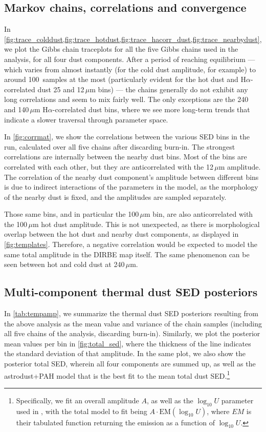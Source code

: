 \documentclass{aa}
\begin{document}
\subsection{Markov chains, correlations and convergence}
In
\cref{fig:trace_colddust,fig:trace_hotdust,fig:trace_hacorr_dust,fig:trace_nearbydust},
we plot the Gibbs chain traceplots for all the five Gibbs chains used
in the analysis, for all four dust components. After a period of
reaching equilibrium --- which varies from almost instantly (for the
cold dust amplitude, for example) to around 100~samples at the most
(particularly evident for the hot dust and H$\alpha$-correlated dust
25 and 12\,$\mu $m bins) --- the chains generally do not exhibit any
long correlations and seem to mix fairly well. The only exceptions are
the 240 and 140\,$\mu$m H$\alpha$-correlated dust bins, where we see
more long-term trends that indicate a slower traversal through
parameter space.

In \cref{fig:corrmat}, we show the correlations between the various
SED bins in the run, calculated over all five chains after discarding
burn-in. The strongest correlations are internally between the nearby
dust bins. Most of the bins are correlated with each other, but they
are anticorrelated with the 12\,$\mu$m amplitude. The correlation of
the nearby dust component's amplitude between different bins is due to
indirect interactions of the parameters in the model, as the
morphology of the nearby dust is fixed, and the amplitudes are sampled
separately. 

Those same bins, and in particular the 100\,$\mu$m bin, are also
anticorrelated with the 100\,$\mu$m hot dust amplitude.  This is not
unexpected, as there is morphological overlap between the hot dust and
nearby dust components, as displayed in
\cref{fig:templates}. Therefore, a negative correlation would be
expected to model the same total amplitude in the DIRBE map
itself. The same phenomenon can be seen between hot and cold dust at
240\,$\mu$m.



\subsection{Multi-component thermal dust SED posteriors}

In \cref{tab:tempamp}, we summarize the thermal dust SED posteriors
resulting from the above analysis as the mean value and variance of
the chain samples (including all five chains of the analysis,
discarding burn-in).  Similarly, we plot the posterior mean values per
bin in \cref{fig:total_sed}, where the thickness of the line indicates
the standard deviation of that amplitude.  In the same plot, we also
show the posterior total SED, wherein all four components are summed
up, as well as the astrodust+PAH model that is the best fit to the
mean total dust SED.\footnote{Specifically, we fit an overall
amplitude $A$, as well as the $\log_{10}{U}$ parameter used in
\citet{Hensley2023}, with the total model to fit being
$A\cdot\mathrm{EM}(\log_{10}{U})$, where $EM$ is their tabulated
function returning the emission as a function of $\log_{10}{U}$.}
\end{document}
